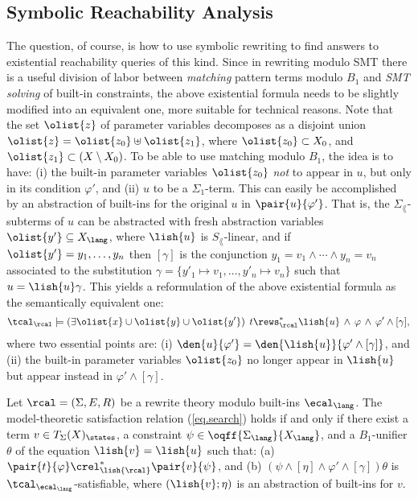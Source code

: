 \subsection{Symbolic Reachability Analysis}

The question, of course, is how to use symbolic rewriting to find
answers to existential reachability queries of this kind.  Since in
rewriting modulo SMT there is a useful division of labor between
\emph{matching} pattern terms modulo $B_{1}$ and \emph{SMT solving} of
built-in constraints, the above existential formula needs to be
slightly modified into an equivalent one, more suitable for technical
reasons.  Note that the set $\olist{z}$ of parameter variables
decomposes as a disjoint union $\olist{z}= \olist{z_{0}} \uplus
\olist{z_{1}}$, where $\olist{z_{0}} \subset X_{0}$, and
$\olist{z_{1}} \subset (X \setminus X_{0})$.  To be able to use
matching modulo $B_{1}$, the idea is to have: (i) the built-in
parameter variables $\olist{z_{0}}$ \emph{not} to appear in $u$, but
only in its condition $\varphi'$, and (ii) $u$ to be a
$\Sigma_{1}$-term.  This can easily be accomplished by an abstraction
of built-ins for the original $u$ in $\pair{u}{\varphi'}$.  That is,
the $\Sigma_\lang$-subterms of $u$ can be abstracted with fresh
abstraction variables $\olist{y'}\subseteq X_\lang$, where $\lish{u}$
is $S_\lang$-linear, and if $\olist{y'} = y_1,\ldots,y_n$ then
$[\gamma]$ is the conjunction $y_1=v_1 \land \cdots \land y_n=v_n$
associated to the substitution $\gamma = \{y'_1 \mapsto
v_1,\ldots,y'_n\mapsto v_n\}$ such that $u = \lish{u}\gamma$.  This
yields a reformulation of the above existential formula as the
semantically equivalent one:
%
\begin{align}\label{eq.search}
  \tcal_\rcal \models \left(\exists \olist{x} \cup \olist{y} \cup
  \olist{y'}\right) \; t \rews_\rcal^* \lish{u} \,\land \,\varphi \,\land \,\varphi' \land [\gamma],
\end{align}
%
where two essential points are: (i) $\den{u}{\varphi'} =
\den{\lish{u}}{\varphi' \land [\gamma]}$, and (ii)
the built-in parameter variables $\olist{z_{0}}$ no longer appear in
$\lish{u}$ but appear instead in $\varphi'  \land  [\gamma]$.

\begin{theorem}\label{thm.search}
  Let $\rcal = (\Sigma,E,R)$ be a rewrite theory modulo built-ins
  $\ecal_\lang$. The model-theoretic satisfaction relation
  (\ref{eq.search}) holds if and only if there exist a term $v \in
  T_{\Sigma}(X)_\states$, a constraint $\psi \in
  \oqff{\Sigma_\lang}{X_\lang}$, and a $B_{1}$-unifier
  $\theta$ of the equation $\lish{v} = \lish{u}$ such that: (a)
  $\pair{t}{\varphi} \crel_{\lish{\rcal}}^*
  \pair{v}{\psi}$,\label{thm.search.a} and (b) $(\psi \wedge [\eta]
  \wedge \varphi' \land [\gamma])\theta$ is
  $\tcal_{\ecal_\lang}$-satisfiable, \label{thm.search.c} where
  $(\lish{v} ; \eta)$ is an abstraction of built-ins for $v$.
\end{theorem}

